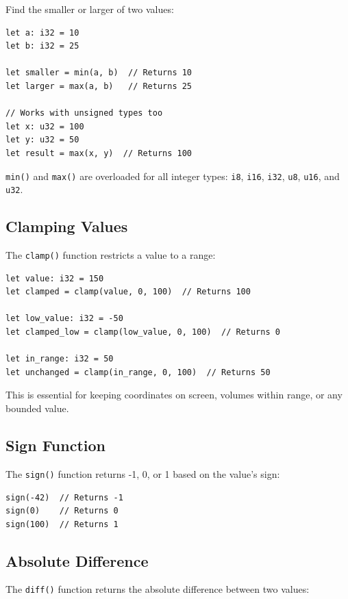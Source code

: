 Find the smaller or larger of two values:

\begin{lstlisting}
let a: i32 = 10
let b: i32 = 25

let smaller = min(a, b)  // Returns 10
let larger = max(a, b)   // Returns 25

// Works with unsigned types too
let x: u32 = 100
let y: u32 = 50
let result = max(x, y)  // Returns 100
\end{lstlisting}

\begin{notebox}
\texttt{min()} and \texttt{max()} are overloaded for all integer types: \texttt{i8}, \texttt{i16}, \texttt{i32}, \texttt{u8}, \texttt{u16}, and \texttt{u32}.
\end{notebox}

\subsection{Clamping Values}

The \texttt{clamp()} function restricts a value to a range:

\begin{lstlisting}
let value: i32 = 150
let clamped = clamp(value, 0, 100)  // Returns 100

let low_value: i32 = -50
let clamped_low = clamp(low_value, 0, 100)  // Returns 0

let in_range: i32 = 50
let unchanged = clamp(in_range, 0, 100)  // Returns 50
\end{lstlisting}

This is essential for keeping coordinates on screen, volumes within range, or any bounded value.

\subsection{Sign Function}

The \texttt{sign()} function returns -1, 0, or 1 based on the value's sign:

\begin{lstlisting}
sign(-42)  // Returns -1
sign(0)    // Returns 0
sign(100)  // Returns 1
\end{lstlisting}

\subsection{Absolute Difference}

The \texttt{diff()} function returns the absolute difference between two values:

